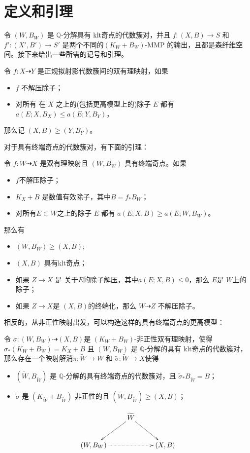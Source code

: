 \section{定义和引理}
令 $(W, B_W)$ 是 $\mathbb{Q}$-分解具有 klt奇点的代数簇对，并且 $f:(X, B)\to S$ 和 $f':(X', B')\to S'$ 是两个不同的$(K_{W}+B_{W})$-MMP 的输出，且都是森纤维空间。接下来给出一些所需的记号和引理。 
\begin{definition}
  令 $f: X\dashrightarrow Y$ 是正规拟射影代数簇间的双有理映射，如果
  \begin{itemize}
    \item $f$ 不解压除子；
    \item 对所有 在 $X$ 之上的(包括更高模型上的)除子 $E$ 都有  $a(E;X,B_{X})\leqslant a(E;Y,B_{Y})$，
  \end{itemize}
  那么记 $(X,B)\geqslant (Y,B_{Y})$。
\end{definition}
对于具有终端奇点的代数簇对，有下面的引理：
\begin{lemma}\label{terminalorder}
  \cite[Lemma 13.8]{haconMinimalModelProgram2012} 令 $f:W\dashrightarrow X$ 是双有理映射且 $(W,B_W)$  具有终端奇点。如果
  \begin{itemize}
    \item $f$不解压除子；
    \item $K_X+B$ 是数值有效除子，其中$B=f_*B_W$；
    \item  对所有$E \subset W$之上的除子 $E$ 都有 $a(E;X,B)\geqslant a(E;W,B_W)$。
  \end{itemize}
  那么有
  \begin{itemize}
    \item $(W,B_W)\geqslant (X,B)$;
    \item $(X,B)$ 具有klt奇点；
    \item 如果 $Z\to X$ 是 关于$E$的除子解压，其中$a(E;X,B)\leqslant 0$，那么 $E$是 $W$上的除子；
    \item 如果 $Z\to X$是 $(X,B)$的终端化，那么 $W\dashrightarrow Z$ 不解压除子。
  \end{itemize}
\end{lemma}
相反的，从非正性映射出发，可以构造这样的具有终端奇点的更高模型：
\begin{lemma}\label{terminalresolution}
  \cite[Lemma 3.5]{liuSarkisovProgramGeneralized2021} 令 $\sigma:(W,B_W)\dashrightarrow (X,B)$是 $(K_W+B_W)$-非正性双有理映射，使得 $\sigma_*(K_W+B_W)=K_X+B$ 且 $(W,B_W)$ 是 $\mathbb{Q}$-分解的具有 klt奇点的代数簇对，那么存在一个映射解消$\pi:\tilde{W}\to W $ 和 $\tilde{\sigma}:\tilde{W}\to X$使得 
  \begin{itemize}
    \item $(\tilde{W},B_{\tilde{W}})$ 是 $\mathbb{Q}$-分解的具有终端奇点的代数簇对，且 $\tilde{\sigma}_*B_{\tilde{W}}=B$；
    \item $\tilde{\sigma}$ 是 $(K_{\tilde{W}}+B_{\tilde{W}})$-非正性的且 $(\tilde{W},B_{\tilde{W}})\geqslant (X,B)$；
  \end{itemize}
  \[
    \xymatrix{
    & \widetilde{W}\ar[ld]\ar[rd] & \\
      (W,B_{W})\ar@{.>}[rr] & &(X,B)
    }
  \]
  
\end{lemma}

